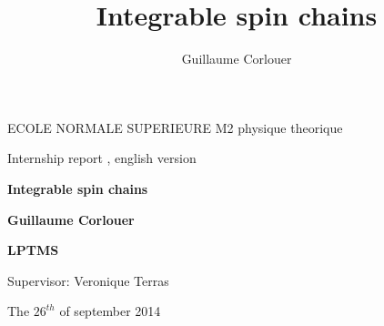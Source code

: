 \documentclass[12pt]{article}
\title{Integrable spin chains}
\author{Guillaume Corlouer}
\begin{document}
\begin{titlepage}

\begin{center}
ECOLE NORMALE SUPERIEURE M2 physique theorique

  Internship report , english version
\end{center}


\begin{center}\bfseries\Huge
Integrable spin chains
\end{center}

\vspace*{1cm} %

\begin{center}\bfseries\Large
Guillaume Corlouer
\end{center}

\vspace*{1cm}

\begin{center}\bfseries\Large
LPTMS
\end{center}
\vspace*{1cm}

\begin{center}
Supervisor: Veronique Terras
\end{center}

\begin{center}
The $26^{th}$ of september 2014
\end{center}

\end{titlepage}
\end{document}
